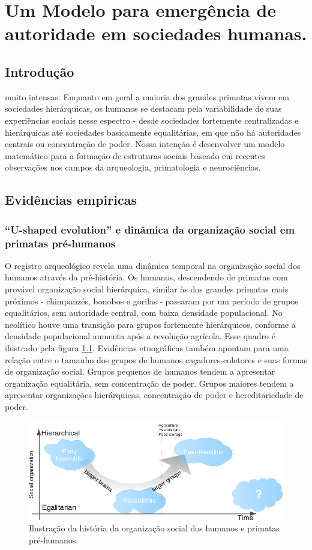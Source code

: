 \chapter{Um Modelo para emergência de autoridade em sociedades humanas.}
\section{Introdução}
 muito intensas\cite{deWaal2007}. Enquanto em geral a maioria dos grandes primatas vivem em sociedades hierárquicas, os humanos se destacam pela variabilidade de suas experiências sociais nesse espectro - desde sociedades fortemente centralizadas e hierárquicas até sociedades basicamente equalitárias, em que não há autoridades centrais ou concentração de poder. Nossa intenção é desenvolver um modelo matemático para a formação de estruturas sociais baseado em recentes observações nos campos da arqueologia, primatologia e neurociências. 
\section{Evidências empiricas}
\subsection{``U-shaped evolution'' e dinâmica da organização social em primatas pré-humanos} 
O registro arqueológico revela uma dinâmica temporal na organização social dos humanos através da pré-história. Os humanos, descendendo de primatas com provável organização social hierárquica, similar às dos grandes primatas mais próximos - chimpanzés, bonobos e gorilas - passaram por um período de grupos equalitários, sem autoridade central, com baixa densidade populacional. No neolítico houve uma transição para grupos fortemente hierárquicos, conforme a densidade populacional aumenta após a revolução agrícola. Esse quadro é ilustrado pela figura \ref{fig:ushaped}. Evidências etnográficas também apontam para uma relação entre o tamanho dos grupos de humanos caçadores-coletores e suas formas de organização social\cite{Currie2010}. Grupos pequenos de humanos tendem a apresentar organização equalitária, sem concentração de poder. Grupos maiores tendem a apresentar organizações hierárquicas, concentração de poder e hereditariedade de poder. 
\begin{figure}
	\centering
	\includegraphics[width = \textwidth]{figuras/ushaped.png}
 	\caption{\label{fig:ushaped} Ilustração da história da organização social dos humanos e primatas pré-humanos.}
\end{figure}

